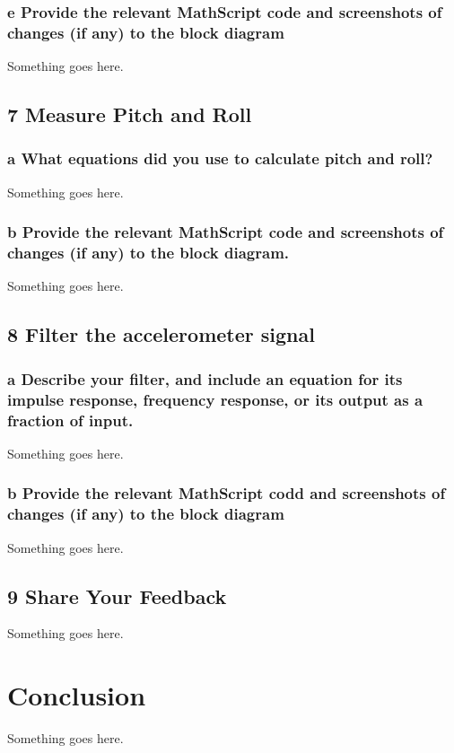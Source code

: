 \documentclass[10pt,a4paper]{article}
\begin{document}
    \subsubsection*{e Provide the relevant MathScript code and screenshots of changes (if any) to the block diagram}
      Something goes here.
  \subsection*{7 Measure Pitch and Roll}
    \subsubsection*{a What equations did you use to calculate pitch and roll?}
      Something goes here.
    \subsubsection*{b Provide the relevant MathScript code and screenshots of changes (if any) to the block diagram.}
      Something goes here.
  \subsection*{8 Filter the accelerometer signal}
    \subsubsection*{a Describe your filter, and include an equation for its impulse response, frequency response, or its output as a fraction of input.}
      Something goes here.
    \subsubsection*{b Provide the relevant MathScript codd and screenshots of changes (if any) to the block diagram}
      Something goes here.
  \subsection*{9 Share Your Feedback}
    Something goes here.
\section*{Conclusion}
  Something goes here.
\end{document}
